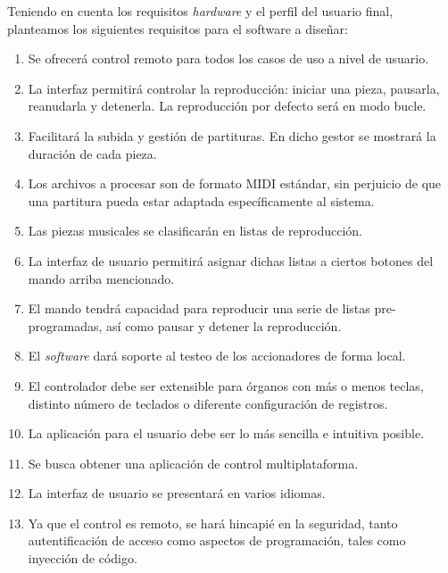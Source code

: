 Teniendo en cuenta los requisitos \textit{hardware} y el perfil del usuario final, planteamos los siguientes requisitos para el software a diseñar:

\begin{enumerate}

	\item Se ofrecerá control remoto para todos los casos de uso a nivel de usuario.
	
	\item La interfaz permitirá controlar la reproducción: iniciar una pieza, pausarla, reanudarla y detenerla. La reproducción por defecto será en modo bucle.
	
	\item Facilitará la subida y gestión de partituras. En dicho gestor se mostrará la duración de cada pieza.
	
	\item Los archivos a procesar son de formato MIDI estándar, sin perjuicio de que una partitura pueda estar adaptada específicamente al sistema.
	
	\item Las piezas musicales se clasificarán en listas de reproducción.
	
	\item La interfaz de usuario permitirá asignar dichas listas a ciertos botones del mando arriba mencionado.
	
	\item El mando tendrá capacidad para reproducir una serie de listas pre-programadas, así como pausar y detener la reproducción.
	
	\item El \textit{software} dará soporte al testeo de los accionadores de forma local.
	
	\item El controlador debe ser extensible para órganos con más o menos teclas, distinto número de teclados o diferente configuración de registros.
	
	\item La aplicación para el usuario debe ser lo más sencilla e intuitiva posible.
	
	\item Se busca obtener una aplicación de control multiplataforma.
	
	\item La interfaz de usuario se presentará en varios idiomas.
	
	\item Ya que el control es remoto, se hará hincapié en la seguridad, tanto autentificación de acceso como aspectos de programación, tales como inyección de código.

\end{enumerate}

